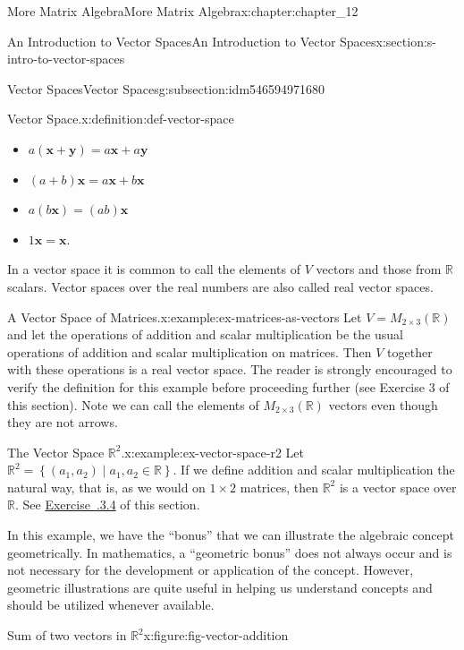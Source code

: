 \documentclass[oneside,10pt,]{book}
\newcommand{\xreffont}{\relax}
\numberwithin{equation}{section}
\renewcommand{\vec}[1]{\mathbf{#1}}
\begin{document}
\begin{chapterptx}{More Matrix Algebra}{}{More Matrix Algebra}{}{}{x:chapter:chapter_12}
\begin{sectionptx}{An Introduction to Vector Spaces}{}{An Introduction to Vector Spaces}{}{}{x:section:s-intro-to-vector-spaces}
\begin{subsectionptx}{Vector Spaces}{}{Vector Spaces}{}{}{g:subsection:idm546594971680}
\begin{definition}{Vector Space.}{x:definition:def-vector-space}
\begin{itemize}[label=\textbullet]
\item{}\(a\left(\vec{x}+ \vec{y} \right) =a \vec{x}+a \vec{y}\)%
\item{}\((a +b)\vec{x}= a \vec{x} + b \vec{x}\)%
\item{}\(a \left(b \vec{x}\right) = (a b)\vec{x}\)%
\item{}\(1\vec{x} = \vec{x}\).%
\end{itemize}
%
\end{definition}
In a vector space it is common to call the elements of \(V\) vectors and those from \(\mathbb{R}\) scalars.  Vector spaces over the real numbers are also called real vector spaces.%
\begin{example}{A Vector Space of Matrices.}{x:example:ex-matrices-as-vectors}%
Let \(V = M_{2\times 3}(\mathbb{R})\) and let the operations of addition and scalar multiplication be the usual operations of addition and scalar multiplication on matrices. Then \(V\) together with these operations is a  real vector space. The reader is strongly encouraged to verify the definition for this example before proceeding further (see Exercise 3 of this section). Note we can call the elements of \(M_{2\times 3}(\mathbb{R})\) vectors even though they are not arrows.%
\end{example}
\begin{example}{The Vector Space \(\mathbb{R}^2\).}{x:example:ex-vector-space-r2}%
Let \(\mathbb{R}^2 = \left\{\left(a_1, a_2 \right) \mid a_1,a_2 \in  \mathbb{R}\right\}\). If we define addition and scalar multiplication the natural way, that is, as we would on \(1\times 2\) matrices, then \(\mathbb{R}^2\) is a vector space over \(\mathbb{R}\). See \hyperlink{x:exercise:exercise-12-3-4}{Exercise~{\xreffont 12.3.3.4}} of this section.%
\par
In this example, we have the ``bonus'' that we can illustrate the algebraic concept geometrically. In mathematics, a ``geometric bonus'' does not always occur and is not necessary for the development or application of the concept. However, geometric illustrations are quite useful in helping us understand concepts and should be utilized whenever available.%
\begin{figureptx}{Sum of two vectors in \(\mathbb{R}^2\)}{x:figure:fig-vector-addition}{}%
\begin{image}{0.2}{0.6}{0.2}%

\end{image}
\end{figureptx}
\end{example}
\end{subsectionptx}
\end{sectionptx}
\end{chapterptx}
\end{document}
